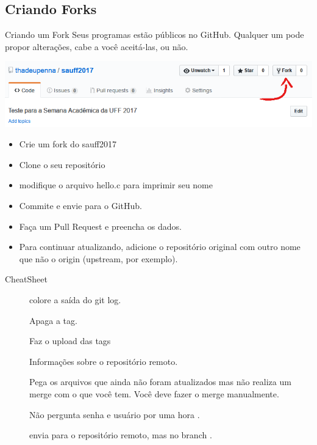 \subsection{Criando Forks}
\begin{frame}{Criando um Fork}
Seus programas estão públicos no GitHub. Qualquer um pode propor alterações, cabe a você aceitá-las, ou não.
\begin{center}
	\includegraphics[width=\textwidth]{figures/fork}
\end{center}
\begin{itemize}
	\item Crie um fork do sauff2017
	\item Clone o seu repositório
	\item modifique o arquivo hello.c para imprimir seu nome
	\item Commite e envie para o GitHub.
	\item Faça um Pull Request e preencha os dados.
	\item Para continuar atualizando, adicione o repositório original com outro nome que não o origin (upstream, por exemplo).
\end{itemize}
\end{frame}


%
%
%
%
%

\begin{frame}{CheatSheet}
\begin{description}
		\item[\color{red}] colore a saída do git log.
		\item[] Apaga a tag.
		\item[ ] Faz o upload das tags
		\item[] Informações sobre o repositório remoto.
		\item[] Pega os arquivos que ainda não foram atualizados mas não realiza um merge com o que você tem. Você deve fazer o merge manualmente.
        \item[] Não pergunta senha e usuário por uma hora .
        \item[] envia para o repositório remoto, mas no branch . 
\end{description}
\end{frame}
